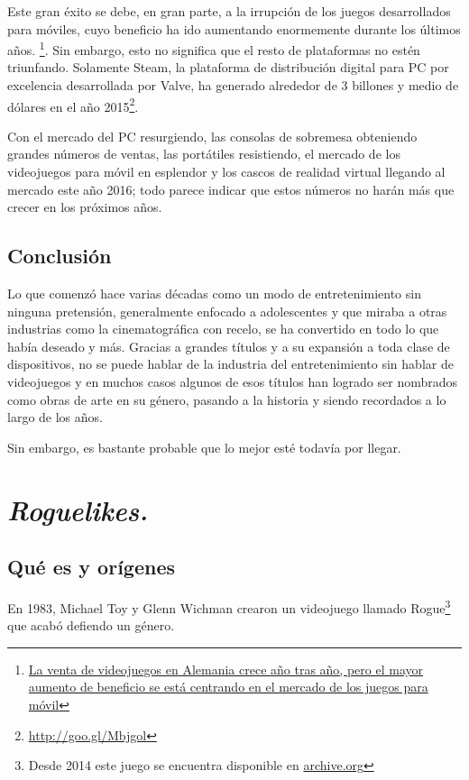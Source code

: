 Este gran éxito se debe, en gran parte, a la irrupción de los juegos desarrollados para móviles, cuyo beneficio ha ido aumentando enormemente durante los últimos años. \footnote{\href{http://goo.gl/Lz9UAa}{La venta de videojuegos en Alemania crece año tras año, pero el mayor aumento de beneficio se está centrando en el mercado de los juegos para móvil}}. Sin embargo, esto no significa que el resto de plataformas no estén triunfando. Solamente Steam, la plataforma de distribución digital para PC por excelencia desarrollada por Valve, ha generado alrededor de 3 billones y medio de dólares en el año 2015\footnote{\url{http://goo.gl/Mbjgol}}.

Con el mercado del PC resurgiendo, las consolas de sobremesa obteniendo grandes números de ventas, las portátiles resistiendo, el mercado de los videojuegos para móvil en esplendor y los cascos de realidad virtual llegando al mercado este año 2016; todo parece indicar que estos números no harán más que crecer en los próximos años.

\subsection{Conclusión}

Lo que comenzó hace varias décadas como un modo de entretenimiento sin ninguna pretensión, generalmente enfocado a adolescentes y que miraba a otras industrias como la cinematográfica con recelo, se ha convertido en todo lo que había deseado y más. Gracias a grandes títulos y a su expansión a toda clase de dispositivos, no se puede hablar de la industria del entretenimiento sin hablar de videojuegos y en muchos casos algunos de esos títulos han logrado ser nombrados como obras de arte en su género, pasando a la historia y siendo recordados a lo largo de los años.

Sin embargo, es bastante probable que lo mejor esté todavía por llegar.

\section{\textit{Roguelikes.}}

\subsection{Qué es y orígenes}

En 1983, Michael Toy y Glenn Wichman crearon un videojuego llamado Rogue\footnote{Desde 2014 este juego se encuentra disponible en \href{https://archive.org/details/msdos_Rogue_1983}{archive.org}} que acabó defiendo un género.

